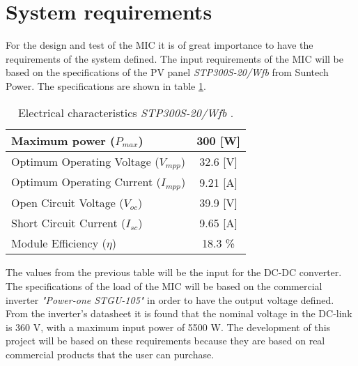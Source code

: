 \section{System requirements}

For the design and test of the MIC it is of great importance to have the requirements of the system defined. The input requirements of the MIC will be based on the specifications of the PV panel \textit{STP300S-20/Wfb} from Suntech Power. The specifications are shown in table \ref{el_charact_PV_panel}.

\begin{table}[htbp]
	\centering
	\begin{tabular}{ |l|c| } 
		\hline
		Maximum power ($P_{max}$) & 300 [W]  \\ \hline
		Optimum Operating Voltage ($V_{mpp}$) & 32.6 [V]  \\ \hline
		Optimum Operating Current ($I_{mpp}$) & 9.21 [A]  \\ \hline
		Open Circuit Voltage ($V_{oc}$) &  39.9 [V]\\ \hline
		Short Circuit Current ($I_{sc}$) & 9.65 [A]  \\ \hline
		Module Efficiency ($\eta$) & 18.3 \%  \\ \hline
	\end{tabular}
	\caption{Electrical characteristics \textit{STP300S-20/Wfb} \cite{PV_panel}.}
	\label{el_charact_PV_panel}
\end{table}

The values from the previous table will be the input for the DC-DC converter. The specifications of the load of the MIC will be based on the commercial inverter \textit{"Power-one STGU-105"}\cite{power_one_inverter} in order to have the output voltage defined. From the inverter's datasheet it is found that the nominal voltage in the DC-link is 360 V, with a maximum input power of 5500 W. \newline
The development of this project will be based on these requirements because they are based on real commercial products that the user can purchase. 


